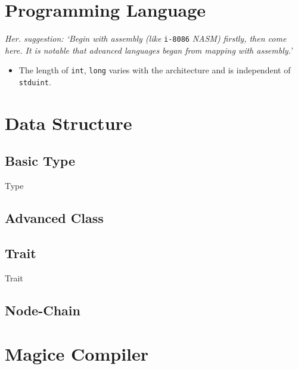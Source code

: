 
\section{Programming Language}

\textit{Her. suggestion: `Begin with assembly (like} \verb|i-8086| \textit{NASM) firstly, then come here. It is notable that advanced languages began from mapping with assembly.'}

\begin{itemize}
	\item The length of \verb`int`, \verb`long` varies with the architecture
		and is independent of \verb`stduint`.
\end{itemize}



\section{Data Structure}

\subsection{Basic Type}
{Type}

\subsection{Advanced Class}

\subsection{Trait}
{Trait}

\subsection{Node-Chain}


\section{Magice Compiler}


